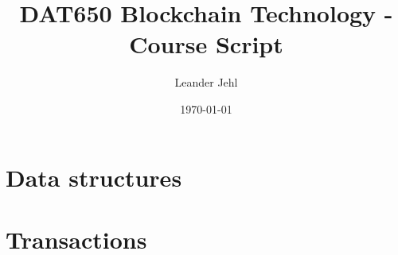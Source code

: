 \documentclass[a4paper,11pt,draft]{report}
\begin{document}
	\title{DAT650 Blockchain Technology - Course Script}
	\author{Leander Jehl}
	\date{\today}
	
	\maketitle

\chapter{Data structures}
	






\chapter{Transactions}


\end{document}
